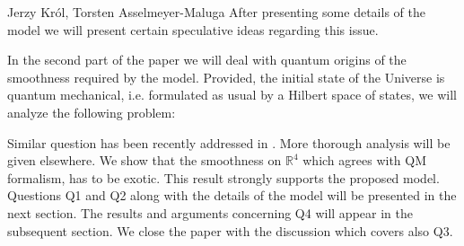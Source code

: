 \begin{artengenv2auth}{Jerzy Kr\'ol, Torsten Asselmeyer-Maluga}
After presenting some details of the model we will present certain speculative ideas regarding this issue.

In the second part of the paper we will deal with quantum origins of the smoothness required by the model. Provided, the initial state of the Universe is quantum mechanical, i.e. formulated as usual by a Hilbert space of states, we will analyze the following problem:


Similar question has been recently addressed in \parencite{JKuniverse17,JK2017a}. More thorough analysis will be given elsewhere. We show that the smoothness on $\mathbb{R}^4$ which agrees with QM formalism, has to be exotic. This result strongly supports the proposed model. Questions Q1 and Q2 along with the details of the model will be presented in the next section. The results and arguments concerning Q4 will appear in the subsequent section. We close the paper with the discussion which covers also Q3.


\end{artengenv2auth}
